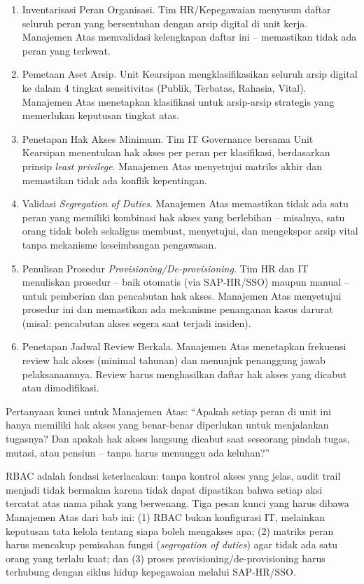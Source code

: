 \documentclass[12pt,a4paper]{report}
\begin{document}
\begin{enumerate}[leftmargin=*]
    \item Inventarisasi Peran Organisasi. Tim HR/Kepegawaian menyusun daftar seluruh peran yang bersentuhan dengan arsip digital di unit kerja. Manajemen Atas memvalidasi kelengkapan daftar ini -- memastikan tidak ada peran yang terlewat.
    \item Pemetaan Aset Arsip. Unit Kearsipan mengklasifikasikan seluruh arsip digital ke dalam 4 tingkat sensitivitas (Publik, Terbatas, Rahasia, Vital). Manajemen Atas menetapkan klasifikasi untuk arsip-arsip strategis yang memerlukan keputusan tingkat atas.
    \item Penetapan Hak Akses Minimum. Tim IT Governance bersama Unit Kearsipan menentukan hak akses per peran per klasifikasi, berdasarkan prinsip \textit{least privilege}. Manajemen Atas menyetujui matriks akhir dan memastikan tidak ada konflik kepentingan.
    \item Validasi \textit{Segregation of Duties}. Manajemen Atas memastikan tidak ada satu peran yang memiliki kombinasi hak akses yang berlebihan -- misalnya, satu orang tidak boleh sekaligus membuat, menyetujui, dan mengekspor arsip vital tanpa mekanisme keseimbangan pengawasan.
    \item Penulisan Prosedur \textit{Provisioning/De-provisioning}. Tim HR dan IT menuliskan prosedur -- baik otomatis (via SAP-HR/SSO) maupun manual -- untuk pemberian dan pencabutan hak akses. Manajemen Atas menyetujui prosedur ini dan memastikan ada mekanisme penanganan kasus darurat (misal: pencabutan akses segera saat terjadi insiden).
    \item Penetapan Jadwal Review Berkala. Manajemen Atas menetapkan frekuensi review hak akses (minimal tahunan) dan menunjuk penanggung jawab pelaksanaannya. Review harus menghasilkan daftar hak akses yang dicabut atau dimodifikasi.
\end{enumerate}

Pertanyaan kunci untuk Manajemen Atas: ``Apakah setiap peran di unit ini hanya memiliki hak akses yang benar-benar diperlukan untuk menjalankan tugasnya? Dan apakah hak akses langsung dicabut saat seseorang pindah tugas, mutasi, atau pensiun -- tanpa harus menunggu ada keluhan?''

\begin{plnbox}
RBAC adalah fondasi keterlacakan: tanpa kontrol akses yang jelas, audit trail menjadi tidak bermakna karena tidak dapat dipastikan bahwa setiap aksi tercatat atas nama pihak yang berwenang. Tiga pesan kunci yang harus dibawa Manajemen Atas dari bab ini: (1) RBAC bukan konfigurasi IT, melainkan keputusan tata kelola tentang siapa boleh mengakses apa; (2) matriks peran harus mencakup pemisahan fungsi (\textit{segregation of duties}) agar tidak ada satu orang yang terlalu kuat; dan (3) proses provisioning/de-provisioning harus terhubung dengan siklus hidup kepegawaian melalui SAP-HR/SSO.
\end{plnbox}
\end{document}
